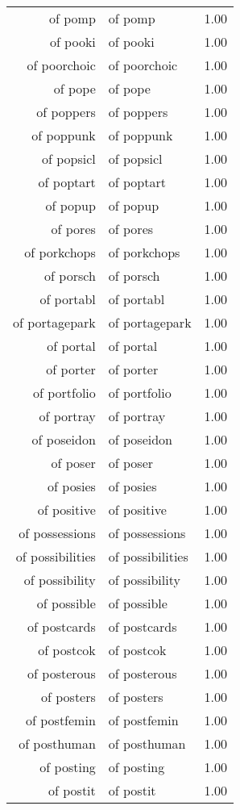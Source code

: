 \begin{table}[ht]
\begin{tabular}{rlr}
  of pomp & of pomp & 1.00 \\ 
  of pooki & of pooki & 1.00 \\ 
  of poorchoic & of poorchoic & 1.00 \\ 
  of pope & of pope & 1.00 \\ 
  of poppers & of poppers & 1.00 \\ 
  of poppunk & of poppunk & 1.00 \\ 
  of popsicl & of popsicl & 1.00 \\ 
  of poptart & of poptart & 1.00 \\ 
  of popup & of popup & 1.00 \\ 
  of pores & of pores & 1.00 \\ 
  of porkchops & of porkchops & 1.00 \\ 
  of porsch & of porsch & 1.00 \\ 
  of portabl & of portabl & 1.00 \\ 
  of portagepark & of portagepark & 1.00 \\ 
  of portal & of portal & 1.00 \\ 
  of porter & of porter & 1.00 \\ 
  of portfolio & of portfolio & 1.00 \\ 
  of portray & of portray & 1.00 \\ 
  of poseidon & of poseidon & 1.00 \\ 
  of poser & of poser & 1.00 \\ 
  of posies & of posies & 1.00 \\ 
  of positive & of positive & 1.00 \\ 
  of possessions & of possessions & 1.00 \\ 
  of possibilities & of possibilities & 1.00 \\ 
  of possibility & of possibility & 1.00 \\ 
  of possible & of possible & 1.00 \\ 
  of postcards & of postcards & 1.00 \\ 
  of postcok & of postcok & 1.00 \\ 
  of posterous & of posterous & 1.00 \\ 
  of posters & of posters & 1.00 \\ 
  of postfemin & of postfemin & 1.00 \\ 
  of posthuman & of posthuman & 1.00 \\ 
  of posting & of posting & 1.00 \\ 
  of postit & of postit & 1.00 \\ 

\end{tabular}
\end{table}
